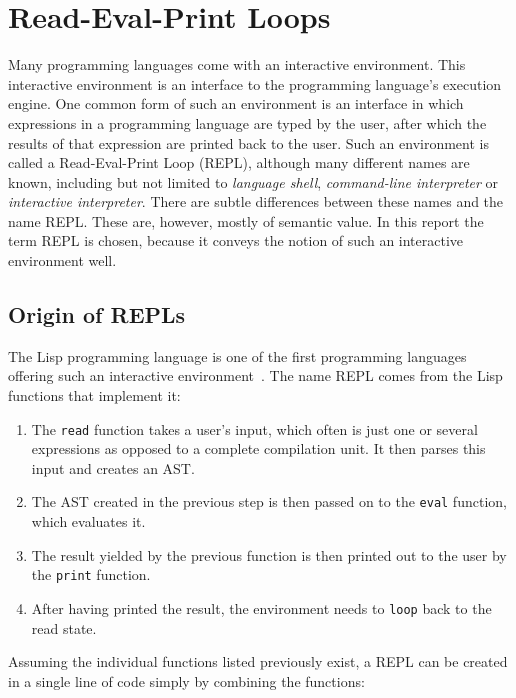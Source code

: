 \section{Read-Eval-Print Loops}
\label{sec:repl}

Many programming languages come with an interactive environment. This
interactive environment is an interface to the programming language's execution
engine. One common form of such an environment is an interface in which
expressions in a programming language are typed by the user, after which the
results of that expression are printed back to the user. Such an environment is
called a Read-Eval-Print Loop (REPL), although many different names are known,
including but not limited to \emph{language shell},
\emph{command-line interpreter} or \emph{interactive interpreter}. There
are subtle differences between these names and the name REPL. These are,
however, mostly of semantic value. In this report the term REPL is chosen,
because it conveys the notion of such an interactive environment well.

\subsection{Origin of REPLs}
\label{ssec:repl-origin}

The Lisp programming language is one of the first programming languages offering
such an interactive environment~\cite{Noyes92}. The name REPL comes from the
Lisp functions that implement it:

\begin{enumerate}
  \item The \texttt{read} function takes a user's input, which often is just one
    or several expressions as opposed to a complete compilation unit. It then
    parses this input and creates an AST.
  \item The AST created in the previous step is then passed on to the
    \texttt{eval} function, which evaluates it.
  \item The result yielded by the previous function is then printed out to the
    user by the \texttt{print} function.
  \item After having printed the result, the environment needs to \texttt{loop}
    back to the read state.
\end{enumerate}

Assuming the individual functions listed previously exist, a REPL can be created
in a single line of code simply by combining the functions:

